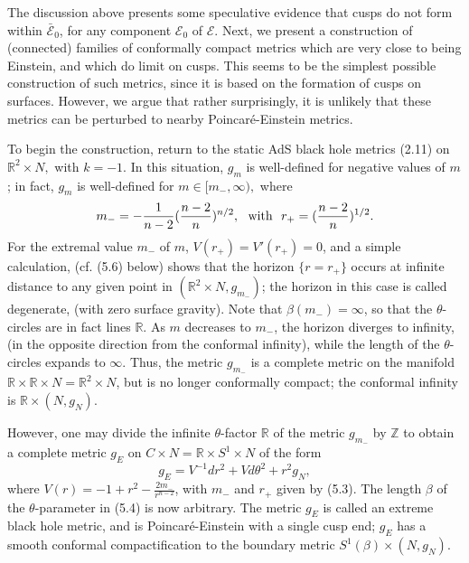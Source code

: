 \documentclass[11pt,amsfonts]{amsart}
\begin{document}
 The discussion above presents some speculative evidence that cusps 
do not form within $\bar{\mathcal E}_{0}$, for any component 
${\mathcal E}_{0}$ of ${\mathcal E}$. Next, we present a construction of 
(connected) families of conformally compact metrics which are very close 
to being Einstein, and which do limit on cusps. This seems to be the simplest 
possible construction of such metrics, since it is based on the 
formation of cusps on surfaces. However, we argue that rather 
surprisingly, it is unlikely that these metrics can be perturbed to 
nearby Poincar\'e-Einstein metrics. 

\medskip

 To begin the construction, return to the static AdS black hole metrics 
(2.11) on ${\mathbb R}^{2}\times N,$ with $k = -1$. In this situation, 
$g_{m}$ is well-defined for negative values of $m$; in fact, $g_{m}$ is 
well-defined for $m \in  [m_{-}, \infty ),$ where 
\begin{equation} \label{e5.3}
m_{-} = -\frac{1}{n-2}(\frac{n-2}{n})^{n/2}, \ \ {\rm with} \ \  r_{+} = 
(\frac{n-2}{n})^{1/2}. 
\end{equation}
For the extremal value $m_{-}$ of $m$, $V(r_{+}) = V' (r_{+}) = 0$, and a 
simple calculation, (cf. (5.6) below) shows that the horizon $\{r = r_{+}\}$ 
occurs at infinite distance to any given point in $({\mathbb R}^{2}\times N, 
g_{m_{-}})$; the horizon in this case is called degenerate, (with zero surface 
gravity). Note that $\beta (m_{-}) = \infty$, so that the $\theta$-circles are 
in fact lines ${\mathbb R}$. As $m$ decreases to $m_{-}$, the horizon diverges 
to infinity, (in the opposite direction from the conformal infinity), while the 
length of the $\theta$-circles expands to $\infty$. Thus, the metric 
$g_{m_{-}}$ is a complete metric on the manifold ${\mathbb R}\times {\mathbb R}
\times N = {\mathbb R}^{2}\times N$, but is no longer conformally compact; 
the conformal infinity is ${\mathbb R}\times (N, g_{N})$. 

 However, one may divide the infinite $\theta$-factor ${\mathbb R}$ of the 
metric $g_{m_{-}}$ by ${\mathbb Z}$ to obtain a complete metric $g_{E}$ 
on $C\times N = {\mathbb R} \times S^{1}\times N$ of the form
\begin{equation} \label{e5.4}
g_{E} = V^{-1}dr^{2} + Vd\theta^{2} + r^{2}g_{N}, 
\end{equation}
where $V(r) = -1+r^{2}-\frac{2m_{-}}{r^{n-2}}$, with $m_{-}$ and 
$r_{+}$ given by (5.3). The length $\beta$ of the $\theta$-parameter 
in (5.4) is now arbitrary. The metric $g_{E}$ is called an extreme black 
hole metric, and is Poincar\'e-Einstein  with a single cusp end; $g_{E}$ 
has a smooth conformal compactification to the boundary metric 
$S^{1}(\beta)\times (N, g_{N})$. 
\end{document}
